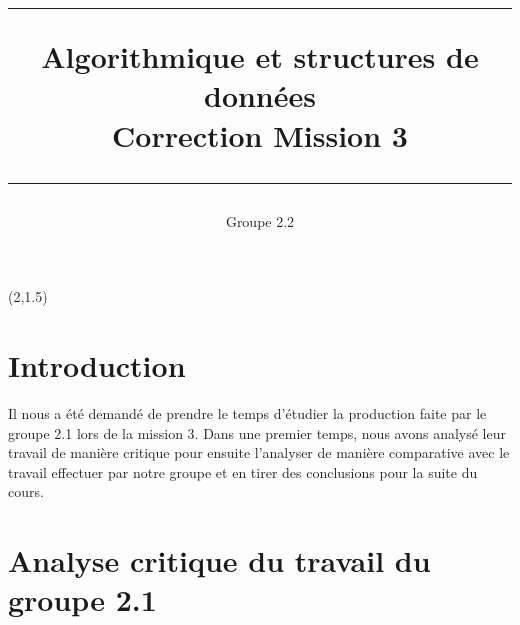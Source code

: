 \documentclass[a4paper ,12pt]{article}
\begin{document}


\setcounter{section}{0}
\setcounter{subsection}{0}



\begin{titlepage}
\begin{center}
\begin{textblock}{12}(2,1.5)
\hspace{3cm} %
\end{textblock} 
\end{center}


\title{ \parbox{10 cm }{\vspace{5cm}
\begin{center}\sf\huge
\rule{10 cm}{1 pt}
\medskip
Algorithmique et structures de données\\Correction Mission 3\\[-4 mm]
\rule{10 cm }{1 pt}
\end{center}
}}
\author {Groupe 2.2}
\end{titlepage}



\maketitle
\thispagestyle{empty} 

\newpage

\section{Introduction}

Il nous a été demandé de prendre le temps d'étudier la production faite par le groupe 2.1 lors de la mission 3. Dans une premier temps, nous avons analysé leur travail de manière critique pour ensuite l'analyser de manière comparative avec le travail effectuer par notre groupe et en tirer des conclusions pour la suite du cours.

\section{Analyse critique du travail du groupe 2.1 }
\end{document}
